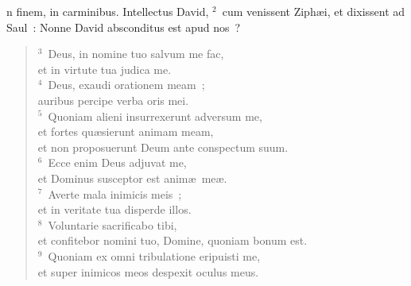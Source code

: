 \bchapter
{}n finem, in carminibus. Intellectus David,
${}^{2}$~cum venissent Ziph\ae i, et dixissent ad Saul~: Nonne David absconditus est apud nos~?
\begin{flushleft}\begin{verse}${}^{3}$~Deus, in nomine tuo salvum me fac,\\ et in virtute tua judica me.\\
${}^{4}$~Deus, exaudi orationem meam~;\\ auribus percipe verba oris mei.\\
${}^{5}$~Quoniam alieni insurrexerunt adversum me,\\ et fortes qu\ae sierunt animam meam,\\ et non proposuerunt Deum ante conspectum suum.\\
${}^{6}$~Ecce enim Deus adjuvat me,\\ et Dominus susceptor est anim\ae\ me\ae .\\
${}^{7}$~Averte mala inimicis meis~;\\ et in veritate tua disperde illos.\\
${}^{8}$~Voluntarie sacrificabo tibi,\\ et confitebor nomini tuo, Domine, quoniam bonum est.\\
${}^{9}$~Quoniam ex omni tribulatione eripuisti me,\\ et super inimicos meos despexit oculus meus.\end{verse}\end{flushleft}



